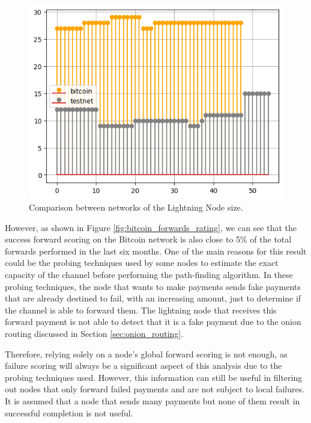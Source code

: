 \begin{figure}[H]
    \begin{center}
      \includegraphics[scale=0.7]{imgs/bitcoin_vs_testnet_channels_size.png}
    \end{center}
    \caption{Comparison between networks of the Lightning Node size.}
    \label{fig:bitcoin_vs_testnet_channels_size}
\end{figure}

However, as shown in Figure \ref{fig:bitcoin_forwards_rating}, we can see that the success
forward scoring on the Bitcoin network is also close to 5\% of the total forwards performed 
in the last six months. One of the main reasons for this result could be the probing techniques 
used by some nodes to estimate the exact capacity of the channel before performing the path-finding
algorithm. In these probing techniques, the node that wants to make payments sends fake payments
that are already destined to fail, with an increasing amount, just to determine if the channel 
is able to forward them. The lightning node that receives this forward payment is not able to 
detect that it is a fake payment due to the onion routing discussed in Section \ref{sec:onion_routing}.

Therefore, relying solely on a node's global forward scoring is not enough, as failure
scoring will always be a significant aspect of this analysis due to the probing techniques
used. However, this information can still be useful in filtering out nodes that only
forward failed payments and are not subject to local failures. It is assumed that a node
that sends many payments but none of them result in successful completion is not useful.

